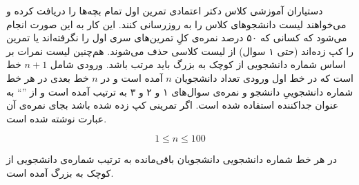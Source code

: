 \gdef\thisproblemauthor{\rl{سپهر هاشمی}}
\begin{problem}{}
{}{}
{}{}{}
دستیاران آموزشی کلاس دکتر اعتمادی تمرین اول تمام بچه‌ها را دریافت کرده و می‌خواهند لیست دانشجوهای کلاس را به روزرسانی کنند. این کار به این صورت انجام می‌شود که کسانی که ۵۰ درصد نمره‌ی کلِ تمرین‌های سری اول را نگرفته‌اند یا تمرین را کپ زده‌اند (حتی ۱ سوال) از لیست کلاسی حذف می‌شوند. هم‌چنین لیست نمرات بر اساس شماره دانشجویی از کوچک به بزرگ باید مرتب باشد.
    \InputFile
 ورودی شامل $n + 1$ خط است که در خط اول ورودی تعداد دانشجویان  $n$ آمده است  و در $n$ خط بعدی در هر خط شماره دانشجوییِ دانشجو و نمره‌ی سوال‌های ۱ و ۲ و ۳ به ترتیب آمده است و از 
 \colorbox{gray!10}{''\lr{\texttt{,}}``}
 به عنوان جداکننده استفاده شده است.
 اگر تمرینی کپ زده شده باشد بجای نمره‌ی آن عبارت
 \colorbox{gray!10}{}
  نوشته شده است.

    $$ 1 \le n \le 100 $$

    \OutputFile

در هر خط شماره دانشجویی دانشجویان باقی‌مانده به ترتیب شماره‌ی دانشجویی از کوچک به بزرگ آمده است.
\Examples



\end{problem}
